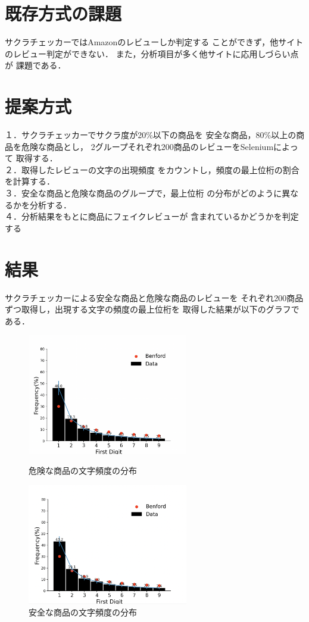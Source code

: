 \documentclass[a4paper, twocolumn]{jsarticle}
\begin{document}
\section{既存方式の課題}
サクラチェッカーではAmazonのレビューしか判定する
ことができず，他サイトのレビュー判定ができない．
また，分析項目が多く他サイトに応用しづらい点が
課題である．

\section{提案方式}
１．サクラチェッカーでサクラ度が20\%以下の商品を
安全な商品，80\%以上の商品を危険な商品とし，
2グループそれぞれ200商品のレビューをSeleniumによって
取得する．\cite{amazon}
\\２．取得したレビューの文字の出現頻度
をカウントし，頻度の最上位桁の割合を計算する．
\\３．安全な商品と危険な商品のグループで，最上位桁
の分布がどのように異なるかを分析する．
\\４．分析結果をもとに商品にフェイクレビューが
含まれているかどうかを判定する

\section{結果}
サクラチェッカーによる安全な商品と危険な商品のレビューを
それぞれ200商品ずつ取得し，出現する文字の頻度の最上位桁を
取得した結果が以下のグラフである．\\

\begin{figure}[htbp]
  \begin{center}
    \includegraphics[width=7cm]{./bad_result.png}
    \caption{危険な商品の文字頻度の分布}
    \includegraphics[width=7cm]{./good_result.png}
    \caption{安全な商品の文字頻度の分布}
  \end{center}
\end{figure}%
\end{document}
